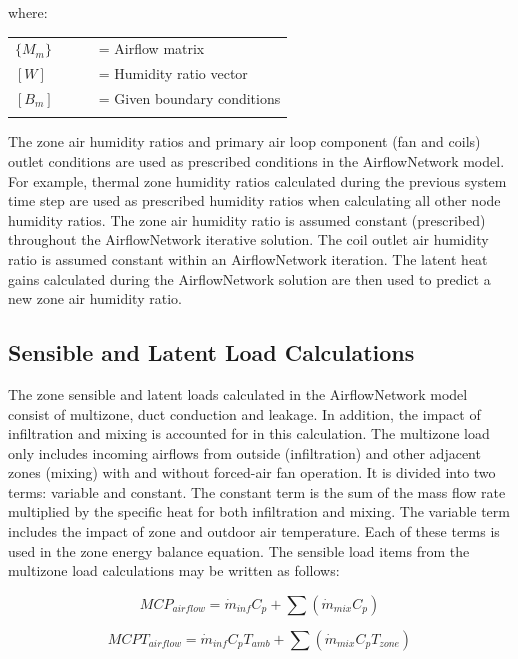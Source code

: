 where:
\begin{tabular}{lp{0.7\linewidth}}
\\
$\{M_m\}$ &= Airflow matrix\\
$[W]$ &= Humidity ratio vector\\
$[B_m]$ &= Given boundary conditions\\
\\
\end{tabular}

The zone air humidity ratios and primary air loop component (fan and coils) outlet conditions are used as prescribed conditions in the AirflowNetwork model. For example, thermal zone humidity ratios calculated during the previous system time step are used as prescribed humidity ratios when calculating all other node humidity ratios. The zone air humidity ratio is assumed constant (prescribed) throughout the AirflowNetwork iterative solution. The coil outlet air humidity ratio is assumed constant within an AirflowNetwork iteration. The latent heat gains calculated during the AirflowNetwork solution are then used to predict a new zone air humidity ratio.

\subsection{Sensible and Latent Load Calculations}\label{sensible-and-latent-load-calculations}

The zone sensible and latent loads calculated in the AirflowNetwork model consist of multizone, duct conduction and leakage. In addition, the impact of infiltration and mixing is accounted for in this calculation. The multizone load only includes incoming airflows from outside (infiltration) and other adjacent zones (mixing) with and without forced-air fan operation. It is divided into two terms: variable and constant. The constant term is the sum of the mass flow rate multiplied by the specific heat for both infiltration and mixing. The variable term includes the impact of zone and outdoor air temperature. Each of these terms is used in the zone energy balance equation. The sensible load items from the multizone load calculations may be written as follows:

\begin{equation}
MCP_{airflow} = \dot{m}_{inf} {C_p} + \sum \left( {\dot{m}_{mix} C_p} \right)
\end{equation}

\begin{equation}
MCPT_{airflow} = \dot{m}_{inf} C_p T_{amb} + \sum \left( \dot{m}_{mix} C_p T_{zone} \right)
\end{equation}

